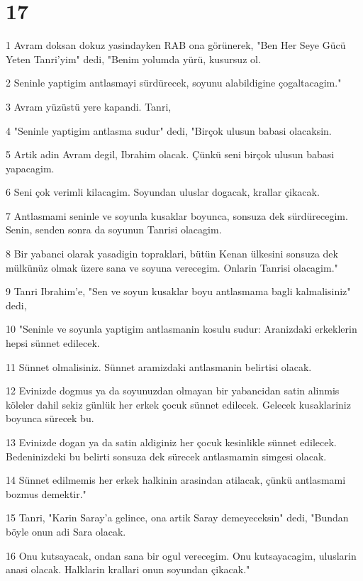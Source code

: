 \chapter{17}

\par 1 Avram doksan dokuz yasindayken RAB ona görünerek, "Ben Her Seye Gücü Yeten Tanri'yim" dedi, "Benim yolumda yürü, kusursuz ol.
\par 2 Seninle yaptigim antlasmayi sürdürecek, soyunu alabildigine çogaltacagim."
\par 3 Avram yüzüstü yere kapandi. Tanri,
\par 4 "Seninle yaptigim antlasma sudur" dedi, "Birçok ulusun babasi olacaksin.
\par 5 Artik adin Avram degil, Ibrahim olacak. Çünkü seni birçok ulusun babasi yapacagim.
\par 6 Seni çok verimli kilacagim. Soyundan uluslar dogacak, krallar çikacak.
\par 7 Antlasmami seninle ve soyunla kusaklar boyunca, sonsuza dek sürdürecegim. Senin, senden sonra da soyunun Tanrisi olacagim.
\par 8 Bir yabanci olarak yasadigin topraklari, bütün Kenan ülkesini sonsuza dek mülkünüz olmak üzere sana ve soyuna verecegim. Onlarin Tanrisi olacagim."
\par 9 Tanri Ibrahim'e, "Sen ve soyun kusaklar boyu antlasmama bagli kalmalisiniz" dedi,
\par 10 "Seninle ve soyunla yaptigim antlasmanin kosulu sudur: Aranizdaki erkeklerin hepsi sünnet edilecek.
\par 11 Sünnet olmalisiniz. Sünnet aramizdaki antlasmanin belirtisi olacak.
\par 12 Evinizde dogmus ya da soyunuzdan olmayan bir yabancidan satin alinmis köleler dahil sekiz günlük her erkek çocuk sünnet edilecek. Gelecek kusaklariniz boyunca sürecek bu.
\par 13 Evinizde dogan ya da satin aldiginiz her çocuk kesinlikle sünnet edilecek. Bedeninizdeki bu belirti sonsuza dek sürecek antlasmamin simgesi olacak.
\par 14 Sünnet edilmemis her erkek halkinin arasindan atilacak, çünkü antlasmami bozmus demektir."
\par 15 Tanri, "Karin Saray'a gelince, ona artik Saray demeyeceksin" dedi, "Bundan böyle onun adi Sara olacak.
\par 16 Onu kutsayacak, ondan sana bir ogul verecegim. Onu kutsayacagim, uluslarin anasi olacak. Halklarin krallari onun soyundan çikacak."
